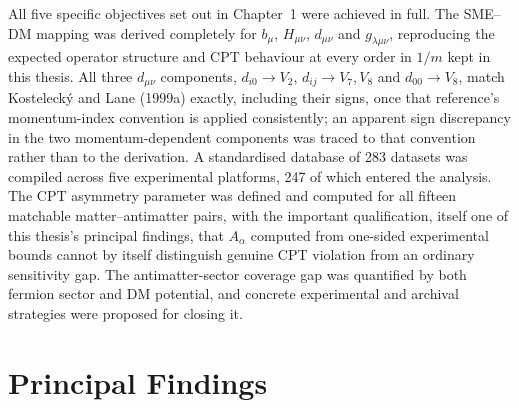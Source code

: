 All five specific objectives set out in Chapter~1 were achieved in full.
The SME--DM mapping was derived completely for $b_\mu$, $H_{\mu\nu}$,
$d_{\mu\nu}$ and $g_{\lambda\mu\nu}$, reproducing the expected operator structure and CPT
behaviour at every order in $1/m$ kept in this thesis. All three
$d_{\mu\nu}$ components, $d_{i0}\to V_2$, $d_{ij}\to V_7,V_8$ and
$d_{00}\to V_8$, match Kostelecký and Lane (1999a) exactly, including their
signs, once that reference's momentum-index convention is applied
consistently; an apparent sign discrepancy in the two momentum-dependent
components was traced to that convention rather than to the derivation. A standardised database
of 283 datasets was compiled across five experimental platforms, 247 of
which entered the analysis. The CPT
asymmetry parameter was defined and computed for all fifteen matchable
matter--antimatter pairs, with the important qualification, itself one of
this thesis's principal findings, that $A_\alpha$ computed from one-sided
experimental bounds cannot by itself distinguish genuine CPT violation
from an ordinary sensitivity gap. The antimatter-sector coverage gap was
quantified by both fermion sector and DM potential, and concrete
experimental and archival strategies were proposed for closing it.

\section{Principal Findings}

